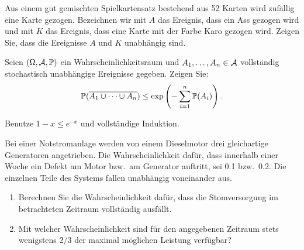 Aus einem gut gemischten Spielkartensatz
bestehend aus 52 Karten wird zufällig eine Karte gezogen. Bezeichnen wir mit
$A$ das Ereignis, dass ein Ass gezogen wird und mit $K$ das Ereignis, dass eine
Karte mit der Farbe Karo gezogen wird. Zeigen Sie, dass die Ereignisse $A$ und
$K$ unabhängig sind. 


 Seien
$(\Omega, \mathcal A, \mathbb P)$ ein Wahrscheinlichkeitsraum und $A_1, \dots, A_n \in\mathcal A$
vollständig stochastisch unabhängige Ereignisse  gegeben. Zeigen Sie:
\begin{equation*}
    \mathbb P( \overline{A_1 \cup \dots \cup A_n} ) \leq \exp \left( - \sum_{i=1}^{n} \mathbb P(A_i) \right).
\end{equation*}

\solution Benutze $1-x \leq e^{-x}$ und vollständige Induktion.


Bei einer Notstromanlage werden von einem Dieselmotor drei gleichartige
Generatoren angetrieben. Die Wahrscheinlichkeit dafür, dass innerhalb einer
Woche ein Defekt am Motor bzw.\ am Generator auftritt, sei 0.1 bzw.~0.2. Die
einzelnen Teile des Systems fallen unabhängig voneinander aus.
\begin{enumerate}
\item Berechnen Sie die Wahrscheinlichkeit dafür, dass die Stomversorgung
im betrachteten Zeitraum vollständig ausfällt.
\item Mit welcher Wahrscheinlichkeit sind für den angegebenen Zeitraum
stets wenigstens $2/3$ der maximal möglichen Leistung verfügbar?
\end{enumerate}

